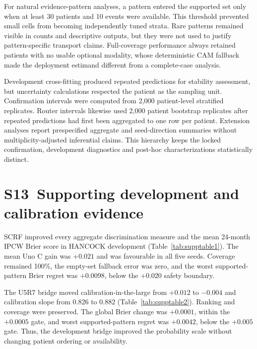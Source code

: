 \documentclass[pdflatex,sn-nature]{sn-jnl}
\begin{document}
For natural evidence-pattern analyses, a pattern entered the supported set only when at least 30 patients and 10 events were available. This threshold prevented small cells from becoming independently tuned strata. Rare patterns remained visible in counts and descriptive outputs, but they were not used to justify pattern-specific transport claims. Full-coverage performance always retained patients with no usable optional modality, whose deterministic CAM fallback made the deployment estimand different from a complete-case analysis.

Development cross-fitting produced repeated predictions for stability assessment, but uncertainty calculations respected the patient as the sampling unit. Confirmation intervals were computed from 2,000 patient-level stratified replicates. Router intervals likewise used 2,000 patient bootstrap replicates after repeated predictions had first been aggregated to one row per patient. Extension analyses report prespecified aggregate and seed-direction summaries without multiplicity-adjusted inferential claims. This hierarchy keeps the locked confirmation, development diagnostics and post-hoc characterizations statistically distinct.

\section*{S13~Supporting development and calibration evidence}
SCRF improved every aggregate discrimination measure and the mean 24-month IPCW Brier score in HANCOCK development (Table~\ref{tab:supptable1}). The mean Uno C gain was $+0.021$ and was favourable in all five seeds. Coverage remained 100\%, the empty-set fallback error was zero, and the worst supported-pattern Brier regret was $+0.0098$, below the $+0.020$ safety boundary.

The U5R7 bridge moved calibration-in-the-large from $+0.012$ to $-0.004$ and calibration slope from 0.826 to 0.882 (Table~\ref{tab:supptable2}). Ranking and coverage were preserved. The global Brier change was $+0.0001$, within the $+0.0005$ gate, and worst supported-pattern regret was $+0.0042$, below the $+0.005$ gate. Thus, the development bridge improved the probability scale without changing patient ordering or availability.
\end{document}
